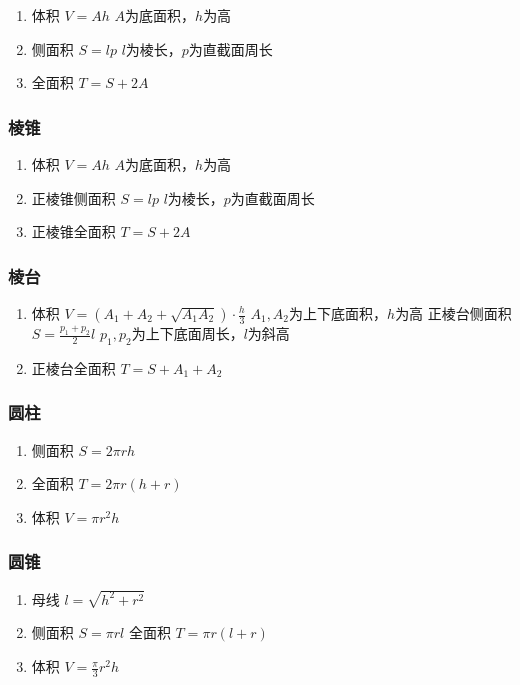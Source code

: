 \documentclass[landscape,twocolumn,a4paper]{article}
\begin{document}
	\begin{enumerate}
		\item 体积
		$V=Ah$
		$A$为底面积，$h$为高
		\item 侧面积
		$S=lp$
		$l$为棱长，$p$为直截面周长
		\item 全面积
		$T=S+2A$
	\end{enumerate}

	\subsubsection*{棱锥}

	\begin{enumerate}
		\item 体积
		$V=Ah$
		$A$为底面积，$h$为高
		\item 正棱锥侧面积
		$S=lp$
		$l$为棱长，$p$为直截面周长
		\item 正棱锥全面积
		$T=S+2A$
	\end{enumerate}

	\subsubsection*{棱台}

	\begin{enumerate}
		\item 体积
		$V=(A_1+A_2+\sqrt{A_1A_2}) \cdot \frac{h}{3}$
		$A_1,A_2$为上下底面积，$h$为高    正棱台侧面积
		$S=\frac{p_1+p_2}{2}l$
		$p_1,p_2$为上下底面周长，$l$为斜高
		\item 正棱台全面积
		$T=S+A_1+A_2$
	\end{enumerate}

	\subsubsection*{圆柱}

	\begin{enumerate}
		\item 侧面积
		$S=2\pi rh$
		\item 全面积
		$T=2\pi r(h+r)$
		\item 体积
		$V=\pi r^2h$
	\end{enumerate}

	\subsubsection*{圆锥}

	\begin{enumerate}
		\item 母线
		$l=\sqrt{h^2+r^2}$
		\item 侧面积
		$S=\pi rl$    全面积
		$T=\pi r(l+r)$
		\item 体积
		$V=\frac{\pi}{3} r^2h$
	\end{enumerate}
\end{document}
